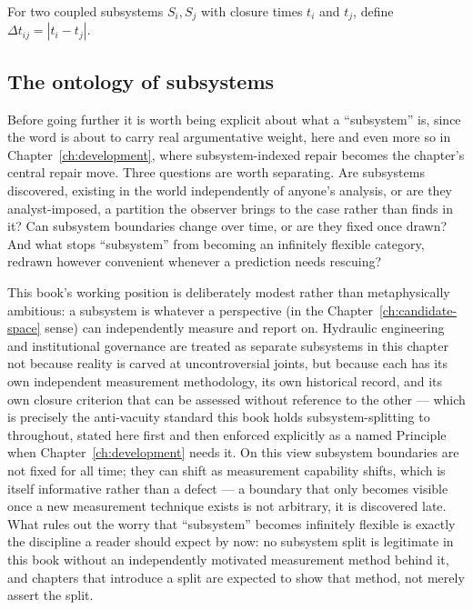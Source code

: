 \begin{definition}
For two coupled subsystems $S_i, S_j$ with closure times $t_i$ and $t_j$, define $\Delta t_{ij} = |t_i - t_j|$.
\end{definition}

\subsection*{The ontology of subsystems}

Before going further it is worth being explicit about what a ``subsystem'' is, since the word is about to carry real argumentative weight, here and even more so in Chapter~\ref{ch:development}, where subsystem-indexed repair becomes the chapter's central repair move. Three questions are worth separating. Are subsystems discovered, existing in the world independently of anyone's analysis, or are they analyst-imposed, a partition the observer brings to the case rather than finds in it? Can subsystem boundaries change over time, or are they fixed once drawn? And what stops ``subsystem'' from becoming an infinitely flexible category, redrawn however convenient whenever a prediction needs rescuing?

This book's working position is deliberately modest rather than metaphysically ambitious: a subsystem is whatever a perspective (in the Chapter~\ref{ch:candidate-space} sense) can independently measure and report on. Hydraulic engineering and institutional governance are treated as separate subsystems in this chapter not because reality is carved at uncontroversial joints, but because each has its own independent measurement methodology, its own historical record, and its own closure criterion that can be assessed without reference to the other --- which is precisely the anti-vacuity standard this book holds subsystem-splitting to throughout, stated here first and then enforced explicitly as a named Principle when Chapter~\ref{ch:development} needs it. On this view subsystem boundaries are not fixed for all time; they can shift as measurement capability shifts, which is itself informative rather than a defect --- a boundary that only becomes visible once a new measurement technique exists is not arbitrary, it is discovered late. What rules out the worry that ``subsystem'' becomes infinitely flexible is exactly the discipline a reader should expect by now: no subsystem split is legitimate in this book without an independently motivated measurement method behind it, and chapters that introduce a split are expected to show that method, not merely assert the split.

